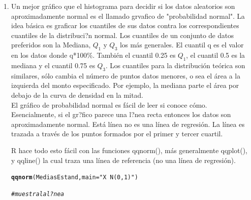 \documentclass[12pt,letterpaper]{article}\usepackage[]{graphicx}\usepackage[]{color}
\makeatletter
\newcommand{\hlstr}[1]{\textcolor[rgb]{0.192,0.494,0.8}{#1}}%
\newcommand{\hlcom}[1]{\textcolor[rgb]{0.678,0.584,0.686}{\textit{#1}}}%
\newcommand{\hlstd}[1]{\textcolor[rgb]{0.345,0.345,0.345}{#1}}%
\newcommand{\hlkwc}[1]{\textcolor[rgb]{0.333,0.667,0.333}{#1}}%
\newcommand{\hlkwd}[1]{\textcolor[rgb]{0.737,0.353,0.396}{\textbf{#1}}}%
\newenvironment{kframe}{%
 \def\at@end@of@kframe{}%
 \ifinner\ifhmode%
  \def\at@end@of@kframe{\end{minipage}}%
  \begin{minipage}{\columnwidth}%
 \fi\fi%
 \def\FrameCommand##1{\hskip\@totalleftmargin \hskip-\fboxsep
 \colorbox{shadecolor}{##1}\hskip-\fboxsep
     \hskip-\linewidth \hskip-\@totalleftmargin \hskip\columnwidth}%
 \MakeFramed {\advance\hsize-\width
   \@totalleftmargin\z@ \linewidth\hsize
   \@setminipage}}%
 {\par\unskip\endMakeFramed%
 \at@end@of@kframe}
\newenvironment{knitrout}{}{} %
\makeatother
\begin{document}
\begin{enumerate}
\begin{knitrout}
\end{knitrout}

\item Un mejor gr\'afico que el histograma para decidir si los datos aleatorios son aproximadamente normal es el llamado grvafico de "probabilidad normal". La idea b\'asica es graficar los cuantiles de sus datos contra los correspondientes cuantiles de la distribuci?n normal. Los cuantiles de un conjunto de datos preferidos son la Mediana, $Q_1$ y $Q_3$ los m\'as generales. El cuantil q es el valor en los datos donde q*100\%. Tambi\'en el cuantil 0.25 es $Q_1$, el cuantil 0.5 es la mediana y el cuantil 0.75 es $Q_3$. Los cuantiles para la distribuci\'on te\'orica son similares, s\'olo cambia el n\'umero de puntos datos menores, o sea el \'area a la izquierda del monto especificado. Por ejemplo, la mediana parte el \'area por debajo de la curva de densidad en la mitad.\\

El gr\'afico de probabilidad normal es f\'acil de leer si conoce c\'omo. Esencialmente, si el gr?fico parece una l?nea recta entonces los datos son aproximadamente normal. Est\'a l\'inea no es una l\'inea de regresi\'on. La l\'inea es trazada a trav\'es de los puntos formados por el primer y tercer cuartil.

R hace todo esto f\'acil con las funciones qqnorm(), m\'as generalmente qqplot(), y qqline() la cual traza una l\'inea de referencia (no una l\'inea de regresi\'on).
\begin{knitrout}
\color{fgcolor}\begin{kframe}
\begin{alltt}
\hlkwd{qqnorm}\hlstd{(MediasEstand,} \hlkwc{main}\hlstd{=}\hlstr{"X ~ N(0, 1)"}\hlstd{)}

\hlcom{#muestra la l?nea}


\end{alltt}
\end{kframe}
\end{knitrout}
\end{enumerate}
\end{document}
